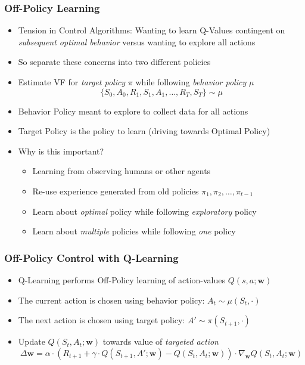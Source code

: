 \documentclass[handout]{beamer}
\begin{document}
\begin{frame}
\frametitle{Off-Policy Learning}
\pause
\begin{itemize}[<+->]
\item Tension in Control Algorithms: Wanting to learn Q-Values contingent on {\em subsequent optimal behavior} versus wanting to explore all actions
\item So separate these concerns into two different policies 
\item Estimate VF for {\em target policy} $\pi$  while following {\em behavior policy} $\mu$
$$\{S_0, A_0, R_1, S_1, A_1, \ldots, R_T, S_T\} \sim \mu$$
\item Behavior Policy meant to explore to collect data for all actions
\item Target Policy is the policy to learn (driving towards Optimal Policy)
\item Why is this important?
\begin{itemize}[<+->]
\item Learning from observing  humans or other agents
\item Re-use experience generated from  old policies  $\pi_1, \pi_2, \ldots, \pi_{t-1}$
\item Learn about {\em optimal} policy while following {\em exploratory} policy
\item Learn about {\em multiple} policies while following {\em one} policy
\end{itemize}
\end{itemize}
\end{frame}

\begin{frame}
\frametitle{Off-Policy Control with Q-Learning}
\pause
\begin{itemize}[<+->]
\item Q-Learning performs Off-Policy learning of action-values $Q(s,a;\bm{w})$
\item The current action is chosen using behavior policy: $A_t \sim \mu(S_t,\cdot)$
\item The next action is chosen using target policy: $A' \sim \pi(S_{t+1}, \cdot)$
\item Update $Q(S_t, A_t;\bm{w})$ towards value of {\em targeted action}
$$\Delta \bm{w} = \alpha \cdot (R_{t+1} + \gamma \cdot Q(S_{t+1}, A'; \bm{w}) - Q(S_t, A_t; \bm{w})) \cdot \nabla_{\bm{w}} Q(S_t, A_t; \bm{w})$$ 
\end{itemize}
\end{frame}
\end{document}
